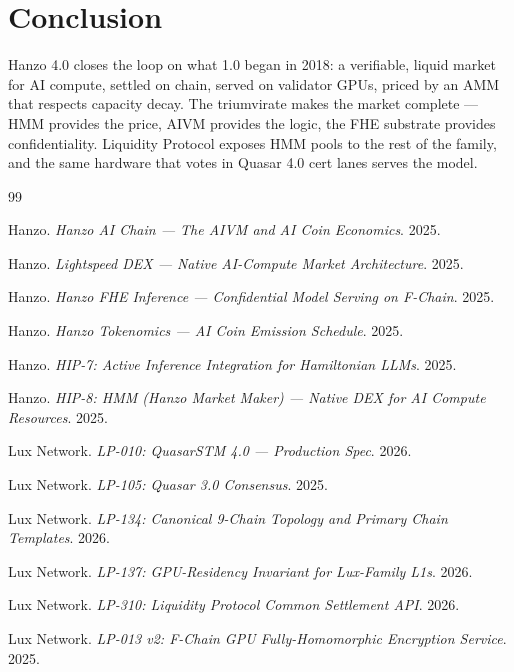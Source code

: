 \documentclass[11pt,letterpaper]{article}
\begin{document}
\section{Conclusion}
\label{sec:conclusion}

Hanzo 4.0 closes the loop on what 1.0 began in 2018: a verifiable,
liquid market for AI compute, settled on chain, served on validator GPUs,
priced by an AMM that respects capacity decay. The triumvirate makes the
market complete --- HMM provides the price, AIVM provides the logic,
the FHE substrate provides confidentiality. Liquidity Protocol exposes
HMM pools to the rest of the family, and the same hardware that votes
in Quasar 4.0 cert lanes serves the model.


\begin{thebibliography}{99}

 Hanzo. \emph{Hanzo AI Chain --- The AIVM and AI Coin Economics}. 2025.

 Hanzo. \emph{Lightspeed DEX --- Native AI-Compute Market Architecture}. 2025.

 Hanzo. \emph{Hanzo FHE Inference --- Confidential Model Serving on F-Chain}. 2025.

 Hanzo. \emph{Hanzo Tokenomics --- AI Coin Emission Schedule}. 2025.

 Hanzo. \emph{HIP-7: Active Inference Integration for Hamiltonian LLMs}. 2025.

 Hanzo. \emph{HIP-8: HMM (Hanzo Market Maker) --- Native DEX for AI Compute Resources}. 2025.

 Lux Network. \emph{LP-010: QuasarSTM 4.0 --- Production Spec}. 2026.

 Lux Network. \emph{LP-105: Quasar 3.0 Consensus}. 2025.

 Lux Network. \emph{LP-134: Canonical 9-Chain Topology and Primary Chain Templates}. 2026.

 Lux Network. \emph{LP-137: GPU-Residency Invariant for Lux-Family L1s}. 2026.

 Lux Network. \emph{LP-310: Liquidity Protocol Common Settlement API}. 2026.

 Lux Network. \emph{LP-013 v2: F-Chain GPU Fully-Homomorphic Encryption Service}. 2025.

\end{thebibliography}
\end{document}
